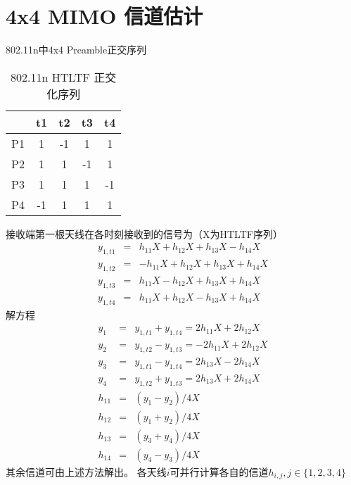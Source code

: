 
\section{4x4 MIMO 信道估计}

802.11n中4x4 Preamble正交序列
\begin{table}[tbh]
\centering
\begin{tabular}{c|c|c|c|c}
\hline
 & t1 & t2 & t3 & t4 \\
\hline
P1 & 1  & -1 & 1 & 1 \\
P2 & 1  & 1 & -1 & 1 \\
P3 & 1  & 1 & 1 & -1 \\
P4 & -1  & 1 & 1 & 1 \\
\hline
\end{tabular}
\caption{802.11n HTLTF 正交化序列}
\label{tab:dot11nHTLTFOtho}
\end{table}

接收端第一根天线在各时刻接收到的信号为（X为HTLTF序列）
\begin{eqnarray}
y_{1, t1} & = & h_{11}X + h_{12}X + h_{13}X - h_{14}X \\
y_{1, t2} & = & -h_{11}X + h_{12}X + h_{13}X + h_{14}X \\
y_{1, t3} & = & h_{11}X - h_{12}X + h_{13}X + h_{14}X \\
y_{1, t4} & = & h_{11}X + h_{12}X - h_{13}X + h_{14}X
\end{eqnarray}
解方程
\begin{eqnarray}
y_{1} & = & y_{1, t1} + y_{1, t4} = 2h_{11}X  + 2h_{12}X  \\
y_{2} & = & y_{1, t2} -  y_{1, t3} = -2h_{11}X  + 2h_{12}X   \\
y_{3} & = & y_{1, t1} - y_{1, t4} = 2h_{13}X  - 2h_{14}X  \\
y_{4} & = & y_{1, t2} + y_{1, t3} = 2h_{13}X  + 2h_{14}X  \\
h_{11} & = & (y_{1} - y_{2}) / 4X \\
h_{12} & = & (y_{1} + y_{2}) / 4X \\
h_{13} & = & (y_{3} + y_{4}) / 4X  \\
h_{14} & = & (y_{4} - y_{3}) / 4X
\end{eqnarray}
其余信道可由上述方法解出。
各天线$i$可并行计算各自的信道$h_{i, j}, j \in \{1, 2, 3, 4\}$